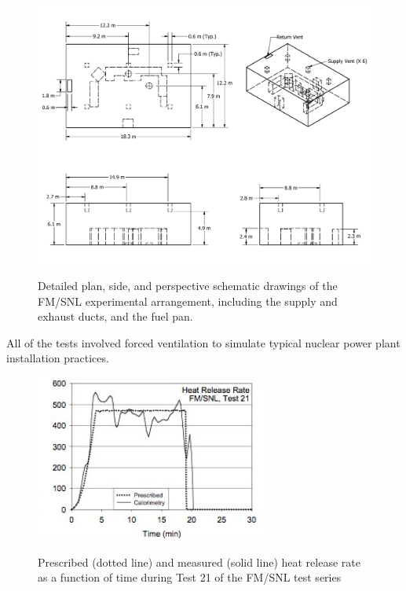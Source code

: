 \begin{figure}
\begin{center}
\includegraphics[width=8.0in, angle=90]{FIGURES/FM_SNL/FMSNL_Detailed}\\
\end{center}
\caption{Detailed plan, side, and perspective schematic drawings of the FM/SNL experimental arrangement, including the supply and exhaust ducts, and the fuel pan.}
 \label{fig:FMSNL_Detailed}
\end{figure}
 
All of the tests involved forced ventilation to simulate typical nuclear power plant installation practices.   

\begin{figure}[\figoptions{t}]
\begin{center}
\includegraphics[width=3.0in]{FIGURES/FM_SNL/FMSNL_HRR}\\
\end{center}
\caption{Prescribed (dotted line) and measured (solid line) heat release rate as a function of time during Test 21 of the FM/SNL test series}
 \label{fig:FMSNL_HRR}
\end{figure}

